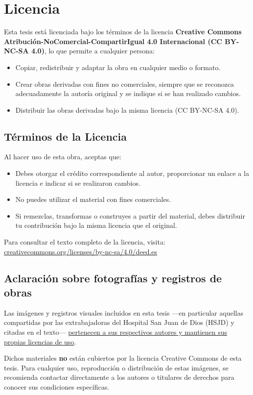 \section*{Licencia}

Esta tesis está licenciada bajo los términos de la licencia \textbf{Creative Commons Atribución-NoComercial-CompartirIgual 4.0 Internacional (CC BY-NC-SA 4.0)}, lo que permite a cualquier persona:

\begin{itemize}
    \item Copiar, redistribuir y adaptar la obra en cualquier medio o formato.
    \item Crear obras derivadas con fines no comerciales, siempre que se reconozca adecuadamente la autoría original y se indique si se han realizado cambios.
    \item Distribuir las obras derivadas bajo la misma licencia (CC BY-NC-SA 4.0).
\end{itemize}

\subsection*{Términos de la Licencia}

Al hacer uso de esta obra, aceptas que:

\begin{itemize}
    \item Debes otorgar el crédito correspondiente al autor, proporcionar un enlace a la licencia e indicar si se realizaron cambios.
    \item No puedes utilizar el material con fines comerciales.
    \item Si remezclas, transformas o construyes a partir del material, debes distribuir tu contribución bajo la misma licencia que el original.
\end{itemize}

Para consultar el texto completo de la licencia, visita:  
\href{https://creativecommons.org/licenses/by-nc-sa/4.0/deed.es}{creativecommons.org/licenses/by-nc-sa/4.0/deed.es}

\subsection*{Aclaración sobre fotografías y registros de obras}

Las imágenes y registros visuales incluidos en esta tesis —en particular aquellas compartidas por las extrabajadoras del Hospital San Juan de Dios (HSJD) y citadas en el texto— \underline{pertenecen a sus respectivos autores y mantienen sus propias licencias de uso}.

Dichos materiales \textbf{no} están cubiertos por la licencia Creative Commons de esta tesis. Para cualquier uso, reproducción o distribución de estas imágenes, se recomienda contactar directamente a los autores o titulares de derechos para conocer sus condiciones específicas.

